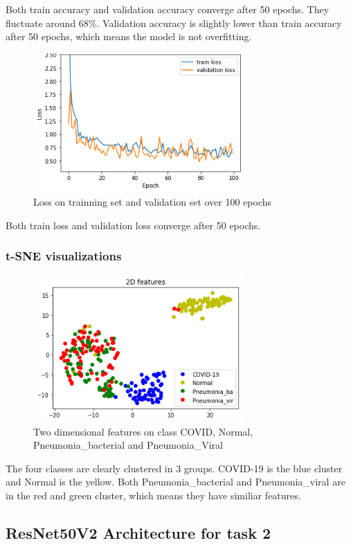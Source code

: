 \documentclass[a4paper,10pt]{article}
\begin{document}
Both train accuracy and validation accuracy converge after 50 epochs. 
They fluctuate around 68\%. 
Validation accuracy is slightly lower than train accuracy after 50 epochs, 
which means the model is not overfitting.

\begin{figure}[H]
  \centering
  \includegraphics[width=8cm]{./images/task2-loss.png}
     \caption{Loss on trainning set and validation set over 100 epochs}
        \label{task2-loss}
\end{figure}

Both train loss and validation loss converge after 50 epochs.

\subsubsection{t-SNE visualizations}
\begin{figure}[H]
  \centering
  \includegraphics[width=8cm]{./images/task2-tsen.png}
     \caption{Two dimensional features on class COVID, Normal, Pneumonia\_bacterial and Pneumonia\_Viral}
        \label{task2-tsen}
\end{figure}

The four classes are clearly clustered in 3 groups. 
COVID-19 is the blue cluster and Normal is the yellow.
Both Pneumonia\_bacterial and Pneumonia\_viral are in the red and green cluster, 
which means they have similiar features.

\subsection{ResNet50V2 Architecture for task 2}
\end{document}
